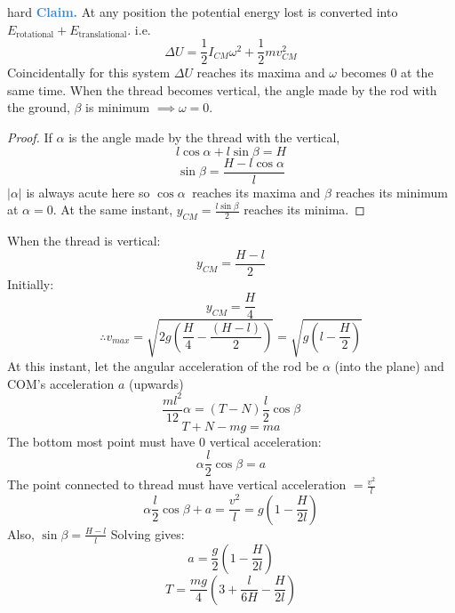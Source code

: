 \begin{solution}{hard}
\textbf{\textcolor[HTML]{3D85C6}{Claim.}} At any position the potential energy lost is converted into $E_\text{rotational}+E_\text{translational}$.
i.e. $$\Delta U = \frac{1}{2}I_{CM}\omega ^2+\frac{1}{2}mv_{CM}^2$$
Coincidentally for this system $\Delta U $ reaches its maxima and $\omega$ becomes $0$ at the same time. 
When the thread becomes vertical, the angle made by the rod with the ground, $\beta$ is minimum $\implies \omega=0$.
\begin{proof} If $\alpha$ is the angle made by the thread with the vertical, 
$$l\cos\alpha + l\sin\beta=H$$
$$\sin\beta=\frac{H-l\cos\alpha}{l}$$
$\left | \alpha \right |$ is always acute here so $\cos\alpha\ $ reaches its maxima and $\beta$ reaches its minimum at $\alpha=0$.
At the same instant, $y_{CM}=\frac{l\sin\beta}{2}$ reaches its minima.
\end{proof}
When the thread is vertical:
$$y_{CM}=\frac{H-l}{2}$$
Initially:
$$y_{CM}=\frac{H}{4}$$
$$\therefore v_{max}=\sqrt{2g\left ( \frac{H}{4} -\frac{(H-l)}{2}\right )}=\sqrt{g\left ( l-\frac{H}{2} \right )}$$
At this instant, let the angular acceleration of the rod be $\alpha$ (into the plane) and COM's acceleration $a$ (upwards)
$$\frac{ml^2}{12}\alpha=(T-N)\frac{l}{2}\cos\beta$$
$$T+N-mg=ma$$
The bottom most point must have $0$ vertical acceleration:
$$\alpha\frac{l}{2}\cos\beta=a$$
The point connected to thread must have vertical acceleration $=\frac{v^2}{l}$
$$\alpha\frac{l}{2}\cos\beta+a=\frac{v^2}{l}=g\left ( 1-\frac{H}{2l} \right )$$
Also, $\sin\beta=\frac{H-l}{l}$
Solving gives:
$$a=\frac{g}{2}\left ( 1-\frac{H}{2l} \right )$$
$$T=\frac{mg}{4}\left(3+\frac{l}{6H}-\frac{H}{2l}\right)$$
\end{solution}
